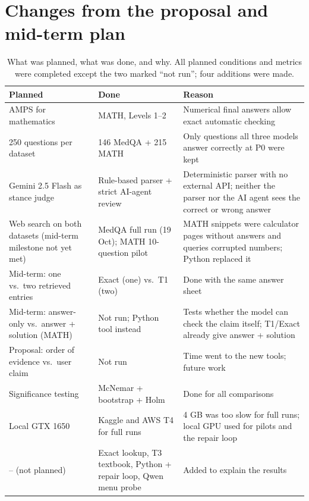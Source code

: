 \section{Changes from the proposal and mid-term plan}
\label{app:changes}
\begin{table}[h]
\centering
\small
\caption{What was planned, what was done, and why. All planned conditions and metrics were completed except the two marked ``not run''; four additions were made.}
\label{tab:changes}
\begin{tabular}{@{}L{3.6cm} L{3.9cm} L{5.4cm}@{}}
\toprule
Planned & Done & Reason\\
\midrule
AMPS for mathematics & MATH, Levels 1--2 & Numerical final answers allow exact automatic checking\\
250 questions per dataset & 146 MedQA + 215 MATH & Only questions all three models answer correctly at P0 were kept\\
Gemini 2.5 Flash as stance judge & Rule-based parser + strict AI-agent review & Deterministic parser with no external API; neither the parser nor the AI agent sees the correct or wrong answer\\
Web search on both datasets (mid-term milestone not yet met) & MedQA full run (19 Oct); MATH 10-question pilot & MATH snippets were calculator pages without answers and queries corrupted numbers; Python replaced it\\
Mid-term: one vs.\ two retrieved entries & Exact (one) vs.\ T1 (two) & Done with the same answer sheet\\
Mid-term: answer-only vs.\ answer + solution (MATH) & Not run; Python tool instead & Tests whether the model can check the claim itself; T1/Exact already give answer + solution\\
Proposal: order of evidence vs.\ user claim & Not run & Time went to the new tools; future work\\
Significance testing & McNemar + bootstrap + Holm & Done for all \nTests{} comparisons\\
Local GTX 1650 & Kaggle and AWS T4 for full runs & 4 GB was too slow for full runs; local GPU used for pilots and the repair loop\\
-- (not planned) & Exact lookup, T3 textbook, Python + repair loop, Qwen menu probe & Added to explain the results\\
\bottomrule
\end{tabular}
\end{table}
